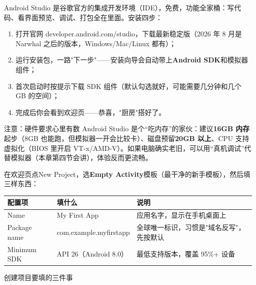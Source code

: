 


Android Studio 是谷歌官方的集成开发环境（IDE），免费，功能全家桶：写代码、看界面预览、调试、打包全在里面。安装四步：

\begin{enumerate}
  \item 打开官网 developer.android.com/studio，下载最新稳定版（2026 年 8 月是 Narwhal 之后的版本，Windows/Mac/Linux 都有）；
  \item 运行安装包，一路"下一步"——安装向导会自动带上\textbf{Android SDK}和模拟器组件；
  \item 首次启动时按提示下载 SDK 组件（默认勾选就好，可能需要几分钟和几个 GB 的空间）；
  \item 完成后你会看到欢迎页——恭喜，"厨房"搭好了。
\end{enumerate}

\begin{tcbwarn}{注意：硬件要求心里有数}
Android Studio 是个“吃内存”的家伙：建议\textbf{16GB 内存}起步（8GB 也能跑，但模拟器一开会比较卡）、磁盘预留\textbf{20GB 以上}、CPU 支持虚拟化（BIOS 里开启 VT-x/AMD-V）。如果电脑确实老旧，可以用“真机调试”代替模拟器（本章第四节会讲），体验反而更流畅。

\end{tcbwarn}


在欢迎页点New Project，选\textbf{Empty Activity}模板（最干净的新手模板），然后填三样东西：

\begin{center}
\begin{tabularx}{\linewidth}{|X|X|X|}
\hline
\textbf{配置项} & \textbf{填什么} & \textbf{说明} \tabularnewline
\hline
Name & My First App & 应用名字，显示在手机桌面上 \tabularnewline
Package name & com.example.myfirstapp & 全球唯一标识，习惯是"域名反写"，先按默认 \tabularnewline
Minimum SDK & API 26（Android 8.0） & 最低支持版本，覆盖 95\%+ 设备 \tabularnewline
\hline
\end{tabularx}
\end{center}

\begin{center}\small\color{gray}创建项目要填的三件事\end{center}

